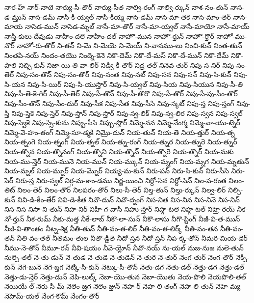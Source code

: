 {నార-హ్
నార్-నాటె
నార్యు-సీ-తొర్
నార్యు-సీత
నాల్వి-రంగ్
నాల్వి-ర్కున్
నాశ-నం-తున్
నాస-డ-మ్తున్
నాస-డమ్
నాసి-కి-య్వల్
నాసి-కియ్మ
నాసె-డమ్
నాసె-మా-తెకె
నాసె-మాం-తెర్
నాసె-మాయ
నాసెడ-మున్
నాసెడ-మ్నల్
నాసే-మా-తొర్
నాసే-మా-య్వల్
నాసే-మాయో
నాసే-మాయ్
నాస్తి-కులు-దేవుడు
నాహిం-దలె
నాహిం-దల్
నాహొ-మున
నాహొ-ర్తున్
నాహొ-ర్తొర్
నాహో-ము-నొర్
నాహో-రు-తొర్
ని-తన్
ని-మె
ని-మెయె
ని-మెయ్
ని-వాసము-లు
నించి-కున్
నింత-తున్
నింతపి-నయ్
నిందం-తయొ
నింద్నె-కెనె
నికొ-దెమ్
నికొ-దే-మస్
నికొ-దే-మున్
నికొ-దేమ్
నికొ-పొలి
నిచ్చి-కున్
నిజా-యి-తి-వా-లిర్
నిడ్వి-కీ-తొర్
నిద్ర-తల్
నినెవ-తుర్
నిపు-స-నిర్
నిపు-సం-తెర్
నిపు-సం-తొన్
నిపు-సం-తొర్
నిపు-సంత
నిపు-సట్
నిపు-సన
నిపు-సన్
నిపు-సి-కున్
నిపు-సి-యన
నిపు-సి-యిర్
నిపు-సి-యుస్తొర్
నిపు-సి-య్వల్
నిపు-సియ
నిపు-సియుస
నిపు-సీ-తి
నిపు-సీ-తె-కె-గిర్
నిపు-సీ-తెర్
నిపు-సీ-తొన్
నిపు-సీ-తొరొ
నిపు-సీ-తొర్
నిపు-సీ-పు-సీం-తొర్
నిపు-సీం-తొన్
నిపు-సీం-దుర్
నిపు-సీక
నిపు-సీత
నిపు-సీసి
నిపు-స్కట్
నిపు-స్త
నిపు-స్తంగ్
నిపు-స్తి
నిపు-స్తెకె
నిపు-స్తెర్
నిపు-స్తొన్
నిపు-స్తొర్
నిపు-స్వ-లిక్
నిపు-స్వ-లిర
నిపు-స్వన
నిపు-స్వల్
నిపు-స్వెకె
నిపు-స్సి-కును
నిప్పు-సీసి
నిప్పు-స్తొర్
నిమ్మె-నన
నిమ్మె-నేంగ్మ
నిమ్మె-వా-యు-ట్నెర్
నిమ్మె-వె-హం-తంగ్
నిమ్మె-సూ-డ్మకి
నిమ్రొ-దున్
నియ-తున్
నియ-తె
నియ-త్తుర్
నియ-త్న
నియ-త్నంగె
నియ-త్నంగ్
నియ-త్నల్
నియ-త్ను-రంగ్
నియ-త్నుర
నియ-త్నురె
నియ-త్నుర్
నియ-త్నొన
నియ-త్నొనంగ్
నియ-త్నొని
నియ-త్నొన్
నియ-త్నొరె
నియ-త్నొర్
నియ-మకు
నియ-ము-న్తెర్
నియ-మునె
నియ-మున్
నియ-మ్కున్
నియ-మ్నంగ్
నియ-మ్నగ
నియ-మ్నతున్
నియ-మ్నల్
నియ-మ్నుర్
నియ-మ్నొర్
నియ్య-మ-కున్
నిరు-పన్
నిరు-సి-కున్
నిరు-సీసి
నిరు-సెర్
నిరు-స్త
నిరు-స్వల్
నిర్గ-మ-కాం-డము
నిర్ణ-యించి
నిర్దో-సిన
నిర్దో-సిన్
నిల-ప-రంత
నిలం-తిట్
నిలం-తెర్
నిలం-తొర్
నిలపరం-తొర్
నిలు-సీ-తెర్
నిల్త-తున్
నిల్తు-ర్కున్
నిల్వ-లిర్
నిల్సి-కున్
నివి-డి-కీం-తేర్
నివి-డి-కీత
నివొ-దున్
నివొ-ద్నంగ్
నిస-నిత
నిస-నిన
నిస-నినె
నిస-నిన్
నిస-నిస
నిసా-ని-తున్
నిహ-నిర్
నిహి-గ-వాసి
నిహు-స్తొర్
నిహ్గ-టలె
నిహ్గ-టల్
నిహ్తె-రెయ్
నీక-నో-ర్తున్
నీక-రుమ్
నీకు-మత్త
నీకే-లాబ్
నీకొ-లా-సున్
నీకొ-లాసు
నీగొ-స్టింగ్
నీజీ-వి-త-మున్
నీజీ-వి-తాంతం
నీట్న-శిక్ష
నీతి-తున్
నీతి-వం-త-లిర్
నీతి-వం-త-లిర్క్
నీతి-వం-తన
నీతి-వం-తన్
నీతి-వం-తల్
నీతిమం-తుల
నీతొ-డ్డితె
నీదో-స్తన
నీదో-స్తన్
నీప-క్క-తోన్
నీమరి-మియ-డెర్
నీము-నె-తొన్
నీమూ-రన్
నీవి-షయం
నీవె-య్లోన్
నీవొ-నయ్
ను-యల్
నుజ-నుజ
నులె-తున్
నుల్పె-తల్
నె-తు-డున్
నె-తుడ
నె-తుడె
నె-తుడెన్
నె-తురె
నె-తుర్
నెంగ-తుర్
నెంగ-తొర్
నెక్సి-కున్
నెగె-బునె
నెగె-బ్తగ
నెట్కి-సి-కున్
నెట్కు-సీ-తొన్
నెతు-డగ
నెతు-డల్
నెత్తు-డగ
నెత్తు-డల్
నెత్తు-డు-న్తెర్
నెత్తు-డున్
నెపి-లుల్క్
నెబా-యొ-తున
నెబా-యొతు
నెయ-పొలి
నెయపొలి-తల్
నెయియే-ల్
నెరు-సీ-మ్
నెలెం-జ్తగ
నెలెం-జ్తున్
నెహ-ర్
నెహ-లి-తంగ్
నెహ-లి-తున్
నెహె-మ్య
నెహెమ్-యల్
నేంగ-కొమ్
నేంగం-తొర్
}
